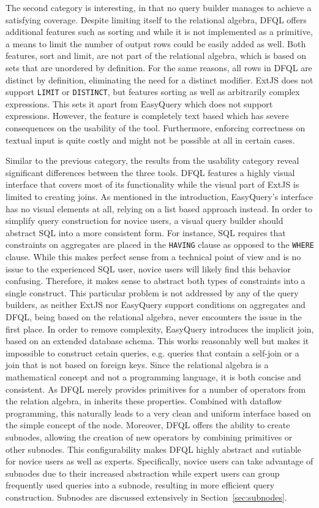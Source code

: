 \documentclass[11pt,a4paper]{globis-book}
\begin{document}
The second category is interesting, in that no query builder manages to achieve a satisfying coverage. Despite limiting itself to the relational algebra, DFQL offers additional features such as sorting and while it is not implemented as a primitive, a means to limit the number of output rows could be easily added as well. Both features, sort and limit, are not part of the relational algebra, which is based on sets that are unordered by definition. For the same reasons, all rows in DFQL are distinct by definition, eliminating the need for a distinct modifier. ExtJS does not support \texttt{LIMIT} or \texttt{DISTINCT}, but features sorting as well as arbitrarily complex expressions. This sets it apart from EasyQuery which does not support expressions. However, the feature is completely text based which has severe consequences on the usability of the tool. Furthermore, enforcing correctness on textual input is quite costly and might not be possible at all in certain cases.

Similar to the previous category, the results from the usability category reveal significant differences between the three tools. DFQL features a highly visual interface that covers most of its functionality while the visual part of ExtJS is limited to creating joins. As mentioned in the introduction, EasyQuery's interface has no visual elements at all, relying on a list based approach instead. In order to simplify query construction for novice users, a visual query builder should abstract SQL into a more consistent form. For instance, SQL requires that constraints on aggregates are placed in the \texttt{HAVING} clause as opposed to the \texttt{WHERE} clause. While this makes perfect sense from a technical point of view and is no issue to the experienced SQL user, novice users will likely find this behavior confusing. Therefore, it makes sense to abstract both types of constraints into a single construct. This particular problem is not addressed by any of the query builders, as neither ExtJS nor EasyQuery support conditions on aggregates and DFQL, being based on the relational algebra, never encounters the issue in the first place. In order to remove complexity, EasyQuery introduces the implicit join, based on an extended database schema. This works reasonably well but makes it impossible to construct cetain queries, e.g. queries that contain a self-join or a join that is not based on foreign keys. Since the relational algebra is a mathematical concept and not a programming language, it is both concise and consistent. As DFQL merely provides primitives for a number of operators from the relation algebra, in inherits these properties. Combined with dataflow programming, this naturally leads to a very clean and uniform interface based on the simple concept of the node. Moreover, DFQL offers the ability to create subnodes, allowing the creation of new operators by combining primitives or other subnodes. This configurability makes DFQL highly abstract and sutiable for novice users as well as experts. Specifically, novice users can take advantage of subnodes due to their increased abstraction while expert users can group frequently used queries into a subnode, resulting in more efficient query construction. Subnodes are discussed extensively in Section~\ref{sec:subnodes}.
\end{document}
